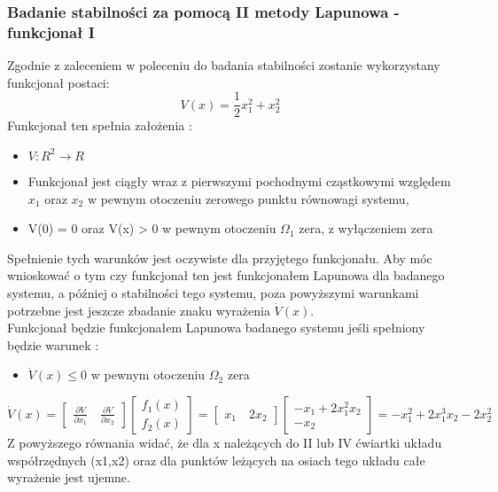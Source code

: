 \documentclass[a4paper,11pt]{article}
\begin{document}
\subsubsection{Badanie stabilności za pomocą II metody Lapunowa - funkcjonał I}
Zgodnie z zaleceniem w poleceniu do badania stabilności zostanie wykorzystany funkcjonał postaci:
\begin{equation*}
V(x)=\frac{1}{2}x_{1}^{2}+x_{2}^{2}
\end{equation*}
Funkcjonał ten spełnia założenia :
\begin{itemize}
\item \( V : R^{2} \rightarrow R \)
\item Funkcjonał jest ciągły wraz z pierwszymi pochodnymi cząstkowymi względem \(x_{1}\) oraz \(x_{2}\) w pewnym otoczeniu zerowego punktu równowagi systemu, 
\item V(0) = 0 oraz V(x) > 0 w pewnym otoczeniu \(\Omega_{1}\) zera, z wyłączeniem zera 
\end{itemize}
Spełnienie tych warunków jest oczywiste dla przyjętego funkcjonału. Aby móc wnioskować o tym czy funkcjonał ten jest funkcjonałem Lapunowa dla badanego systemu, a później o stabilności tego systemu, poza powyższymi warunkami potrzebne jest jeszcze zbadanie znaku wyrażenia \( \dot{V}(x) \). \\ Funkcjonał będzie funkcjonałem Lapunowa badanego systemu jeśli spełniony będzie warunek :
\begin{itemize}
\item \( \dot{V}(x)\leq 0 \) w pewnym otoczeniu \( \Omega_{2}\) zera
\end{itemize} 
\begin{equation*}
\dot{V}(x)=
\begin{bmatrix}
\frac{\partial V}{\partial x_{1}} \quad
\frac{\partial V}{\partial x_{2}} 
\end{bmatrix}
\begin{bmatrix}
f_{1}(x) \\
f_{2}(x)
\end{bmatrix}=
\begin{bmatrix}
x_{1} \quad
2x_{2}
\end{bmatrix}
\begin{bmatrix}
-x_{1}+2x_{1}^{2}x_{2} \\ 
-x_{2}
\end{bmatrix}=
-x_{1}^{2}+2x_{1}^{3}x_{2}-2x_{2}^{2}
\end{equation*}
Z powyższego równania widać, że dla x należących do II lub IV ćwiartki układu współrzędnych (x1,x2) oraz dla punktów leżących na osiach tego układu całe wyrażenie jest ujemne.
\end{document}

